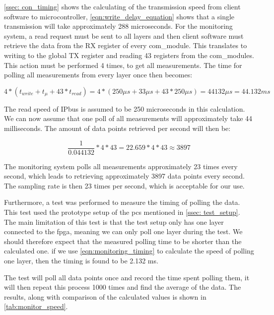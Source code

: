 \documentclass[main.tex]{subfiles}
\begin{document}
\autoref{ssec: con_timing} shows the calculating of the transmission speed from client software to microcontroller, \autoref{eqn:write_delay_equation} shows that a single transmission will take approximately 288 microseconds. For the monitoring system, a read request must be sent to all layers and then client software must retrieve the data from the RX register of every com\_module. This translates to writing to the global TX register and reading 43 registers from the com\_modules. This action must be performed 4 times, to get all measurements. The time for polling all measurements from every layer once then becomes:

\begin{equation} \label{eqn:monitoring_timing}
4*(t_{write}+t_{\mu } + 43*t_{read}) = 4*(250\mu s + 33 \mu s + 43*250\mu s) = 44132 \mu s = 44.132 ms
\end{equation}

The read speed of IPbus is assumed to be 250 microseconds in this calculation. We can now assume that one poll of all measurements will approximately take 44 milliseconds. The amount of data points retrieved per second will then be:

\begin{equation} \label{eqn:data_points_per_second}
\frac{1}{0.044132}*4*43 =  22.659 * 4*43 \approx 3897
\end{equation}

The monitoring system polls all measurements approximately 23 times every second, which leads to retrieving approximately 3897 data points every second. The sampling rate is then 23 times per second, which is acceptable for our use.

Furthermore, a test was performed to measure the timing of polling the data. This test used the prototype setup of the \gls{pcs} mentioned in \autoref{ssec: test_setup}. The main limitation of this test is that the test setup only has one layer connected to the \gls{fpga}, meaning we can only poll one layer during the test. We should therefore expect that the measured polling time to be shorter than the calculated one. if we use \autoref{eqn:monitoring_timing} to calculate the speed of polling one layer, then the timing is found to be 2.132 ms.

The test will poll all data points once and record the time spent polling them, it will then repeat this process 1000 times and find the average of the data. The results, along with comparison of the calculated values is shown in \autoref{tab:monitor_speed}.
\end{document}
